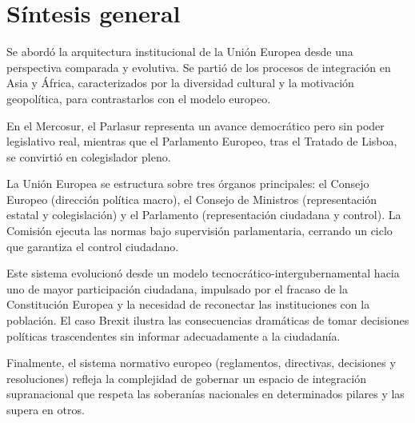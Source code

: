 \documentclass[12pt,oneside]{book}
\begin{document}
\chapter*{Síntesis general}

Se abordó la arquitectura institucional de la Unión Europea desde una perspectiva comparada y evolutiva. Se partió de los procesos de integración en Asia y África, caracterizados por la diversidad cultural y la motivación geopolítica, para contrastarlos con el modelo europeo.

En el Mercosur, el Parlasur representa un avance democrático pero sin poder legislativo real, mientras que el Parlamento Europeo, tras el Tratado de Lisboa, se convirtió en colegislador pleno.

La Unión Europea se estructura sobre tres órganos principales: el Consejo Europeo (dirección política macro), el Consejo de Ministros (representación estatal y colegislación) y el Parlamento (representación ciudadana y control). La Comisión ejecuta las normas bajo supervisión parlamentaria, cerrando un ciclo que garantiza el control ciudadano.

Este sistema evolucionó desde un modelo tecnocrático-intergubernamental hacia uno de mayor participación ciudadana, impulsado por el fracaso de la Constitución Europea y la necesidad de reconectar las instituciones con la población. El caso Brexit ilustra las consecuencias dramáticas de tomar decisiones políticas trascendentes sin informar adecuadamente a la ciudadanía.

Finalmente, el sistema normativo europeo (reglamentos, directivas, decisiones y resoluciones) refleja la complejidad de gobernar un espacio de integración supranacional que respeta las soberanías nacionales en determinados pilares y las supera en otros.

\end{document}
